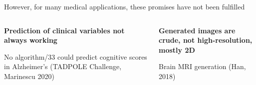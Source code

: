 \documentclass[8pt,xcolor=table,aspectratio=169]{beamer}
\begin{document}
\begin{frame}{However, for many medical applications, these promises have not been fulfilled}


\begin{columns}[t]
\begin{column}{0.5\textwidth}
\centering

\textbf{\large Prediction of clinical variables not always working} 

\vt

No algorithm/33 could predict cognitive scores in Alzheimer's (TADPOLE Challenge, Marinescu 2020)
\vspace{2em}









\end{column}
\begin{column}{0.5\textwidth}
\centering

\textbf{\large Generated images are crude, not high-resolution, mostly 2D}

\vt

Brain MRI generation (Han, 2018)
\begin{figure}

\vo




\end{figure}
\end{column}
\end{columns}

 
 
\end{frame}


\end{document}
